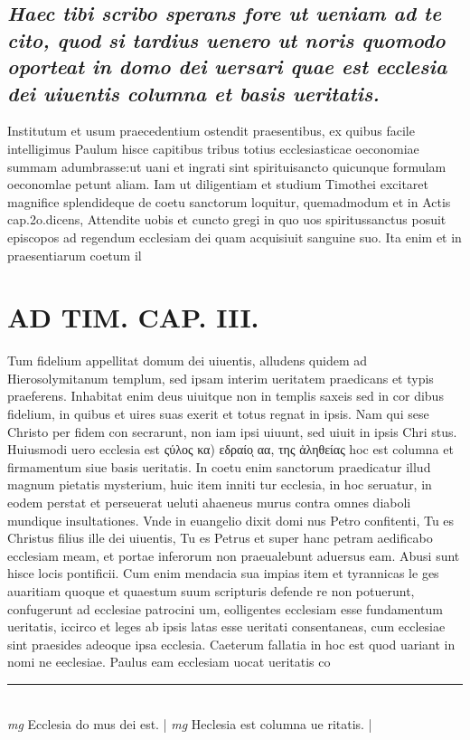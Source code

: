 \documentclass{article}
\begin{document}
\begin{pages}
\subsection*{\textit{Haec tibi scribo sperans fore ut ueniam ad te cito, quod si tardius uenero ut noris quomodo oporteat in domo dei uersari quae est ecclesia dei uiuentis columna et basis ueritatis. }}\pstart Institutum et usum praecedentium ostendit praesentibus, ex quibus facile intelligimus Paulum hisce capitibus tribus totius ecclesiasticae oeconomiae summam adumbrasse:ut uani et ingrati sint spirituisancto quicunque formulam oeconomlae petunt aliam. Iam ut diligentiam et studium Timothei excitaret magnifice splendideque de coetu sanctorum loquitur, quemadmodum et in Actis cap.2o.dicens, Attendite uobis et cuncto gregi in quo uos spiritussanctus posuit episcopos ad regendum ecclesiam dei quam acquisiuit sanguine suo. Ita enim et in praesentiarum coetum il\pend
\section*{AD TIM. CAP. III. }
\marginpar{[ p.134 ]}\pstart Tum fidelium appellitat domum dei uiuentis, alludens quidem ad Hierosolymitanum templum, sed ipsam interim ueritatem praedicans et typis praeferens. Inhabitat enim deus uiuitque non in templis saxeis sed in cor dibus fidelium, in quibus et uires suas exerit et totus regnat in ipsis. Nam qui sese Christo per fidem con secrarunt, non iam ipsi uiuunt, sed uiuit in ipsis Chri stus. Huiusmodi uero ecclesia est ςύλος κα) εδραίοͅ αα, της ἀληθείας hoc est columna et firmamentum siue basis ueritatis. In coetu enim sanctorum praedicatur illud magnum pietatis mysterium, huic item inniti tur ecclesia, in hoc seruatur, in eodem perstat et perseuerat ueluti ahaeneus murus contra omnes diaboli mundique insultationes. Vnde in euangelio dixit domi nus Petro confitenti, Tu es Christus filius ille dei uiuentis, Tu es Petrus et super hanc petram aedificabo ecclesiam meam, et portae inferorum non praeualebunt aduersus eam. Abusi sunt hisce locis pontificii. Cum enim mendacia sua impias item et tyrannicas le ges auaritiam quoque et quaestum suum scripturis defende re non potuerunt, confugerunt ad ecclesiae patrocini um, eolligentes ecclesiam esse fundamentum ueritatis, iccirco et leges ab ipsis latas esse ueritati consentaneas, cum ecclesiae sint praesides adeoque ipsa ecclesia. Caeterum fallatia in hoc est quod uariant in nomi ne eeclesiae. Paulus eam ecclesiam uocat ueritatis co\pend
\vspace{0.5cm}\noindent
\vspace{0.2cm}\rule{1cm}{0.2pt}\\ 
\hspace{0.2cm}\textit{mg}
\footnotesize Ecclesia do mus dei est. 
\normalsize| 
\hspace{0.2cm}\textit{mg}
\footnotesize Heclesia est columna ue ritatis. 
\normalsize| 

\end{pages}
\end{document}
